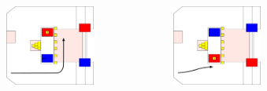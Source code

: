 \documentclass{beamer}
\begin{document}
\begin{frame}
\begin{columns}
\begin{figure}
  \end{figure}
  \begin{figure}
   \includegraphics[scale=0.15]{assets/paths/33_LL}
  \end{figure}
  \begin{figure}
   \includegraphics[scale=0.15]{assets/paths/33_RR}
  \end{figure}
 \end{columns}
\end{frame}
\end{document}
